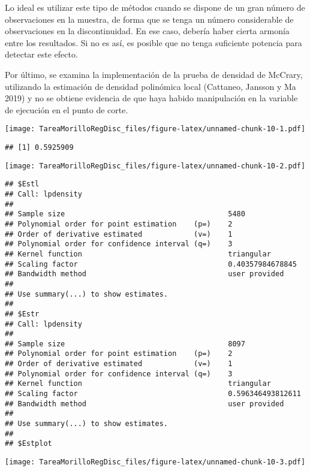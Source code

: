 \documentclass[
]{article}
\begin{document}
Lo ideal es utilizar este tipo de métodos cuando se dispone de un gran
número de observaciones en la muestra, de forma que se tenga un número
considerable de observaciones en la discontinuidad. En ese caso, debería
haber cierta armonía entre los resultados. Si no es así, es posible que
no tenga suficiente potencia para detectar este efecto.

Por último, se examina la implementación de la prueba de densidad de
McCrary, utilizando la estimación de densidad polinómica local
(Cattaneo, Jansson y Ma 2019) y no se obtiene evidencia de que haya
habido manipulación en la variable de ejecución en el punto de corte.

\texttt{[image: TareaMorilloRegDisc\_files/figure-latex/unnamed-chunk-10-1.pdf]}

\begin{verbatim}
## [1] 0.5925909
\end{verbatim}

\texttt{[image: TareaMorilloRegDisc\_files/figure-latex/unnamed-chunk-10-2.pdf]}

\begin{verbatim}
## $Estl
## Call: lpdensity
## 
## Sample size                                      5480
## Polynomial order for point estimation    (p=)    2
## Order of derivative estimated            (v=)    1
## Polynomial order for confidence interval (q=)    3
## Kernel function                                  triangular
## Scaling factor                                   0.40357984678845
## Bandwidth method                                 user provided
## 
## Use summary(...) to show estimates.
## 
## $Estr
## Call: lpdensity
## 
## Sample size                                      8097
## Polynomial order for point estimation    (p=)    2
## Order of derivative estimated            (v=)    1
## Polynomial order for confidence interval (q=)    3
## Kernel function                                  triangular
## Scaling factor                                   0.596346493812611
## Bandwidth method                                 user provided
## 
## Use summary(...) to show estimates.
## 
## $Estplot
\end{verbatim}

\texttt{[image: TareaMorilloRegDisc\_files/figure-latex/unnamed-chunk-10-3.pdf]}
\end{document}
